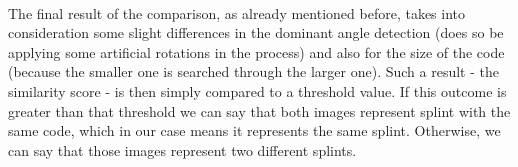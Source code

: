 \newpage
\paragraph{}
The final result of the comparison, as already mentioned before, takes into consideration some slight differences in the dominant angle detection (does so be applying some artificial rotations in the process) and also for the size of the code (because the smaller one is searched through the larger one). Such a result - the similarity score - is then simply compared to a threshold value. If this outcome is greater than that threshold we can say that both images represent splint with the same code, which in our case means it represents the same splint. Otherwise, we can say that those images represent two different splints.











